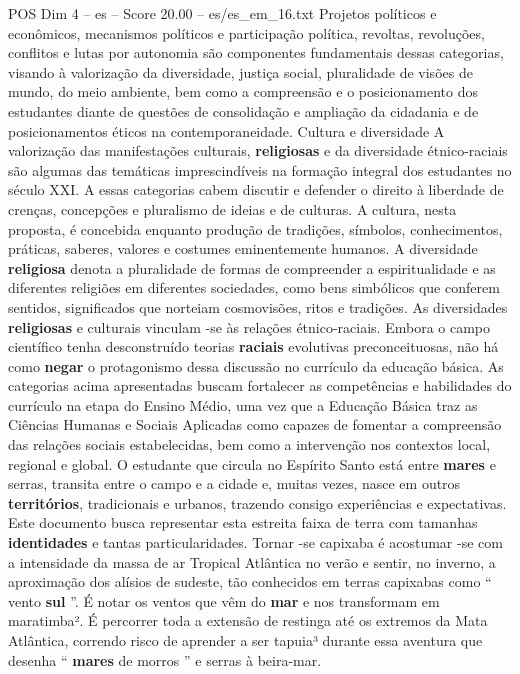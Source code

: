 \begin{textsample}{POS Dim 4 – es – Score 20.00 – es/es\_em\_16.txt}
Projetos políticos e econômicos, mecanismos políticos e participação política, revoltas, revoluções, conflitos e lutas por autonomia são componentes fundamentais dessas categorias, visando à valorização da diversidade, justiça social, pluralidade de visões de mundo, do meio ambiente, bem como a compreensão e o posicionamento dos estudantes diante de questões de consolidação e ampliação da cidadania e de posicionamentos éticos na contemporaneidade.
Cultura e diversidade A valorização das manifestações culturais, \textbf{religiosas} e da diversidade étnico-raciais são algumas das temáticas imprescindíveis na formação integral dos estudantes no século XXI.
A essas categorias cabem discutir e defender o direito à liberdade de crenças, concepções e pluralismo de ideias e de culturas.
A cultura, nesta proposta, é concebida enquanto produção de tradições, símbolos, conhecimentos, práticas, saberes, valores e costumes eminentemente humanos.
A diversidade \textbf{religiosa} denota a pluralidade de formas de compreender a espiritualidade e as diferentes religiões em diferentes sociedades, como bens simbólicos que conferem sentidos, significados que norteiam cosmovisões, ritos e tradições.
As diversidades \textbf{religiosas} e culturais vinculam -se às relações étnico-raciais.
Embora o campo científico tenha desconstruído teorias \textbf{raciais} evolutivas preconceituosas, não há como \textbf{negar} o protagonismo dessa discussão no currículo da educação básica.
As categorias acima apresentadas buscam fortalecer as competências e habilidades do currículo na etapa do Ensino Médio, uma vez que a Educação Básica traz as Ciências Humanas e Sociais Aplicadas como capazes de fomentar a compreensão das relações sociais estabelecidas, bem como a intervenção nos contextos local, regional e global.
O estudante que circula no Espírito Santo está entre \textbf{mares} e serras, transita entre o campo e a cidade e, muitas vezes, nasce em outros \textbf{territórios}, tradicionais e urbanos, trazendo consigo experiências e expectativas.
Este documento busca representar esta estreita faixa de terra com tamanhas \textbf{identidades} e tantas particularidades.
Tornar -se capixaba é acostumar -se com a intensidade da massa de ar Tropical Atlântica no verão e sentir, no inverno, a aproximação dos alísios de sudeste, tão conhecidos em terras capixabas como “ vento \textbf{sul} ”.
É notar os ventos que vêm do \textbf{mar} e nos transformam em maratimba².
É percorrer toda a extensão de restinga até os extremos da Mata Atlântica, correndo risco de aprender a ser tapuia³ durante essa aventura que desenha “ \textbf{mares} de morros ” e serras à beira-mar.

\end{textsample}
